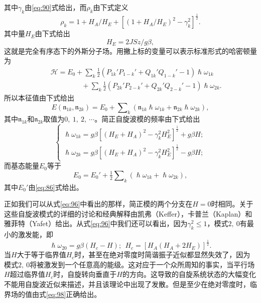 \documentclass{article}
\begin{document}
其中$\gamma_k$由\eqref{eq:90}式给出，而$\rho_k$由下式定义
\begin{equation} \label{eq:93}
\rho_k=1+H_A/H_E+[(1+H_A/H_E)^2-\gamma_k^2]^\frac{1}{2}.
\end{equation}
其中量$H_E$由下式给出
\begin{equation*}
H_E=2JSz/g\beta,
\end{equation*}
这就是完全有序态下的外斯分子场。用撇上标的变量可以表示标准形式的哈密顿量为
\begin{eqnarray} \label{eq:94}
&&\mathcal{H}=E_0+\sum\nolimits_k\tfrac{1}{2}(P_{1k}'P_{1-k}'+Q_{1k}'Q_{1-k}'-1)\hslash\omega_{1k}\nonumber\\
&&~~~~~~~~~~~~~~~~~~~~+\sum\nolimits_k\tfrac{1}{2}(P_{2k}'P_{2-k}'+Q_{2k}'Q_{2-k}'-1)\hslash\omega_{2k}.
\end{eqnarray}
所以本征值由下式给出
\begin{equation} \label{eq:95}
E(\mathfrak{n}_{1k},\mathfrak{n}_{2k})=E_0+\sum\nolimits_k(\mathfrak{n}_{1k}\hslash\omega_{1k}+\mathfrak{n}_{2k}\hslash\omega_{2k}),
\end{equation}
其中$\mathfrak{n}_{1k}$和$\mathfrak{n}_{2k}$取值为$0,~1,~2,~\cdots$。简正自旋波模的频率由下式给出
\begin{equation} \label{eq:96}
\left\{
\begin{array}{l}
\hslash\omega_{1k}=g\beta[(H_E+H_A)^2-\gamma_k^2H_E^2]^\frac{1}{2}+g\beta H;\\
\hslash\omega_{2k}=g\beta[(H_E+H_A)^2-\gamma_k^2H_E^2]^\frac{1}{2}-g\beta H;
\end{array}
\right.
\end{equation}
而基态能量$E_0$等于
\begin{equation} \label{eq:97}
E_0=E_0'+\tfrac{1}{2}\sum\nolimits_k(\hslash\omega_{1k}+\hslash\omega_{2k}),
\end{equation}
其中$E_0'$由\eqref{eq:86}式给出。

正如我们可以从式\eqref{eq:96}中看出的那样，简正模的两个分支在$H=0$时相同。关于这些自旋波模式的详细的讨论和经典解释由凯弗（Keffer），卡普兰（Kaplan）和雅菲特（Yafet）给出。从式\eqref{eq:96}中我们还可以看出，因为$\gamma_k^2\leqslant 1$，模式$2,~0$有最小的激发能，即
\begin{equation} \label{eq:98}
\hslash\omega_{20}=g\beta(H_c-H);~~H_c=[H_A(H_A+2H_E)]^\frac{1}{2}.
\end{equation}
当$H$大于等于临界值$H_c$时，甚至在绝对零度时简谐振子近似都显然失效了，因为模式$2,~0$将被激发到一个任意高的能级。这对应于一个众所周知的事实，当平行场$H$超过临界值$H_c$时，自旋转向垂直于$H$的方向。这导致的自旋系统状态的大幅变化不能用自旋波近似来描述，并且该理论中出现了发散。但是至少在绝对零度时，临界场的值由式\eqref{eq:98}正确给出。
\end{document}
